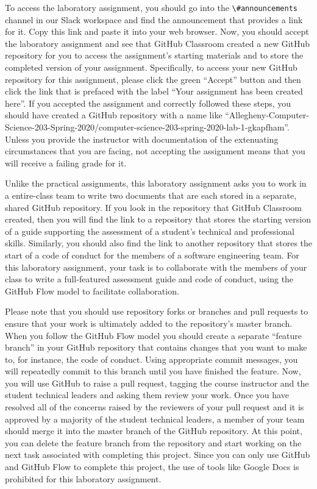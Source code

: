 \documentclass[11pt]{article}
\newcommand{\channel}[1]{\lstinline{#1}}
\begin{document}
To access the laboratory assignment, you should go into the
\channel{\#announcements} channel in our Slack workspace and find the
announcement that provides a link for it. Copy this link and paste it into your
web browser. Now, you should accept the laboratory assignment and see that
GitHub Classroom created a new GitHub repository for you to access the
assignment's starting materials and to store the completed version of your
assignment. Specifically, to access your new GitHub repository for this
assignment, please click the green ``Accept'' button and then click the link
that is prefaced with the label ``Your assignment has been created here''. If
you accepted the assignment and correctly followed these steps, you should have
created a GitHub repository with a name like
``Allegheny-Computer-Science-203-Spring-2020/computer-science-203-spring-2020-lab-1-gkapfham''.
Unless you provide the instructor with documentation of the extenuating
circumstances that you are facing, not accepting the assignment means that you
will receive a failing grade for it.


Unlike the practical assignments, this laboratory assignment asks you to work in
a entire-class team to write two documents that are each stored in a separate,
shared GitHub repository. If you look in the repository that GitHub Classroom
created, then you will find the link to a repository that stores the starting
version of a guide supporting the assessment of a student's technical and
professional skills. Similarly, you should also find the link to another
repository that stores the start of a code of conduct for the members of a
software engineering team. For this laboratory assignment, your task is to
collaborate with the members of your class to write a full-featured assessment
guide and code of conduct, using the GitHub Flow model to facilitate
collaboration.

Please note that you should use repository forks or branches and pull requests
to ensure that your work is ultimately added to the repository's master branch.
%
When you follow the GitHub Flow model you should create a separate ``feature
branch'' in your GitHub repository that contains changes that you want to make
to, for instance, the code of conduct. Using appropriate commit messages, you
will repeatedly commit to this branch until you have finished the feature. Now,
you will use GitHub to raise a pull request, tagging the course instructor and
the student technical leaders and asking them review your work. Once you have
resolved all of the concerns raised by the reviewers of your pull request and it
is approved by a majority of the student technical leaders, a member of your
team should merge it into the master branch of the GitHub repository. At this
point, you can delete the feature branch from the repository and start working
on the next task associated with completing this project.
%
Since you can only use GitHub and GitHub Flow to complete this project, the use
of tools like Google Docs is prohibited for this laboratory assignment.
\end{document}
